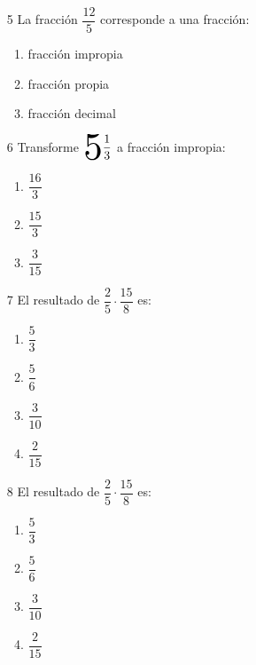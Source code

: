 \documentclass[12pt]{article}
\begin{document}
\begin{multicols}{2}
   \begin{enumerate}
   	\item [5] La fracción  $\dfrac{12}{5} $	corresponde a una fracción:
   	\begin{enumerate}
   		\item fracción impropia\\
   		\item fracción propia\\
   		\item fracción decimal\\
   	\end{enumerate}
   \end{enumerate}
   \begin{enumerate}
   	\item [6] Transforme $\scalerel{5}{\dfrac{1}{3}}$ a fracción impropia: 
   	   	\begin{enumerate}
   		\item $\dfrac{16}{3}$\\
   		\item $\dfrac{15}{3}$\\
   		\item $\dfrac{3}{15}$\\
     	\end{enumerate}
   \end{enumerate} 
\end{multicols}
\begin{multicols}{2}
	\begin{enumerate}
		\item [7]El resultado de $\dfrac{2}{5} \cdot \dfrac{15}{8}$	es:
		\begin{enumerate}
			\item $\dfrac{5}{3}$\\
			\item $\dfrac{5}{6}$\\
			\item $\dfrac{3}{10}$\\
			\item $\dfrac{2}{15}$\\
		\end{enumerate}
	\end{enumerate}
\begin{enumerate}
	\item [8]El resultado de $\dfrac{2}{5} \cdot \dfrac{15}{8}$	es:
	\begin{enumerate}
		\item $\dfrac{5}{3}$\\
		\item $\dfrac{5}{6}$\\
		\item $\dfrac{3}{10}$\\
		\item $\dfrac{2}{15}$\\
	\end{enumerate}
\end{enumerate}
\end{multicols}
\end{document}
